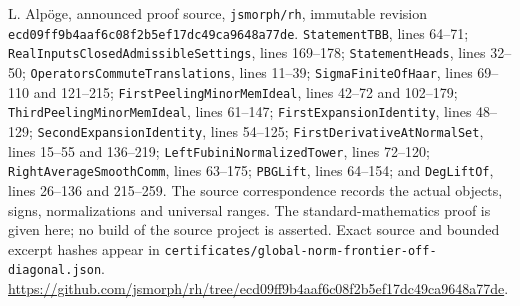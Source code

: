 L. Alp\"oge, announced proof source, \texttt{jsmorph/rh}, immutable
revision \texttt{ecd09ff9b4aaf6c08f2b5ef17dc49ca9648a77de}.
\texttt{StatementTBB}, lines 64--71;
\texttt{RealInputsClosedAdmissibleSettings}, lines 169--178;
\texttt{StatementHeads}, lines 32--50;
\texttt{OperatorsCommuteTranslations}, lines 11--39;
\texttt{SigmaFiniteOfHaar}, lines 69--110 and 121--215;
\texttt{FirstPeelingMinorMemIdeal}, lines 42--72 and 102--179;
\texttt{ThirdPeelingMinorMemIdeal}, lines 61--147;
\texttt{FirstExpansionIdentity}, lines 48--129;
\texttt{SecondExpansionIdentity}, lines 54--125;
\texttt{FirstDerivativeAtNormalSet}, lines 15--55 and 136--219;
\texttt{LeftFubiniNormalizedTower}, lines 72--120;
\texttt{RightAverageSmoothComm}, lines 63--175;
\texttt{PBGLift}, lines 64--154; and
\texttt{DegLiftOf}, lines 26--136 and 215--259.
The source correspondence records the actual objects, signs,
normalizations and universal ranges.  The standard-mathematics
proof is given here; no build of the source project is asserted.
Exact source and bounded excerpt hashes appear in
\texttt{certificates/global-norm-frontier-off-diagonal.json}.
\url{https://github.com/jsmorph/rh/tree/ecd09ff9b4aaf6c08f2b5ef17dc49ca9648a77de}.
